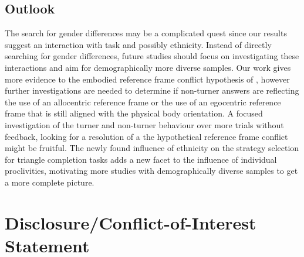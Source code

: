 \documentclass{frontiersSCNS} %
\begin{document}
\subsection{Outlook}
The search for gender differences may be a complicated quest since our results suggest an interaction with task and possibly ethnicity. Instead of directly searching for gender differences, future studies should focus on investigating these interactions and aim for demographically more diverse samples.
Our work gives more evidence to the embodied reference frame conflict hypothesis of \cite{Avraamides2004}, however further investigations are needed to determine if non-turner answers are reflecting the use of an allocentric reference frame or the use of an egocentric reference frame that is still aligned with the physical body orientation. A focused investigation of the turner and non-turner behaviour over more trials without feedback, looking for a resolution of a  the hypothetical reference frame conflict might be fruitful.
The newly found influence of ethnicity on the strategy selection for triangle completion tasks adds a new facet to the influence of individual proclivities, motivating more studies with demographically diverse samples to get a more complete picture.

\section*{Disclosure/Conflict-of-Interest Statement}
\end{document}

